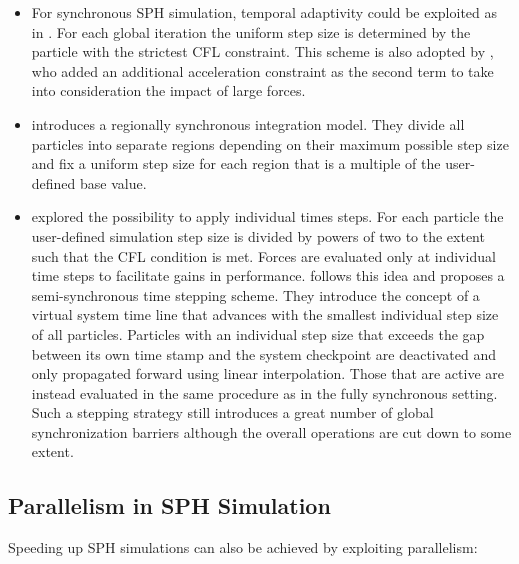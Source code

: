 \documentclass[
	11pt, 
	DIV10,
	ngerman,
	a4paper, 
	oneside, 
	headings=normal, 
	captions=tableheading,
	final, 
	numbers=noenddot
]{scrartcl}
\begin{document}
\begin{itemize}
    \item For synchronous SPH simulation, temporal adaptivity could be exploited as in \cite{desbrun1996smoothed}. For each global iteration the uniform step size is determined by the particle with the strictest CFL constraint. This scheme is also adopted by \cite{bender2010boundary}, who added an additional acceleration constraint as the second term to take into consideration the impact of large forces.
    \item \cite{goswami2014regional} introduces a regionally synchronous integration model. They divide all particles into separate regions depending on their maximum possible step size and fix a uniform step size for each region that is a multiple of the user-defined base value.
    \item \cite{desbrun1996smoothed} explored the possibility to apply individual times steps. For each particle the user-defined simulation step size is divided by powers of two to the extent such that the CFL condition is met. Forces are evaluated only at individual time steps to facilitate gains in performance. \cite{ban2018adaptively} follows this idea and proposes a semi-synchronous time stepping scheme. They introduce the concept of a virtual system time line that advances with the smallest individual step size of all particles. Particles with an individual step size that exceeds the gap between its own time stamp and the system checkpoint are deactivated and only propagated forward using linear interpolation. Those that are active are instead evaluated in the same procedure as in the fully synchronous setting. Such a stepping strategy still introduces a great number of global synchronization barriers although the overall operations are cut down to some extent.
\end{itemize}

\subsection{Parallelism in SPH Simulation}

Speeding up SPH simulations can also be achieved by exploiting parallelism:
\end{document}
